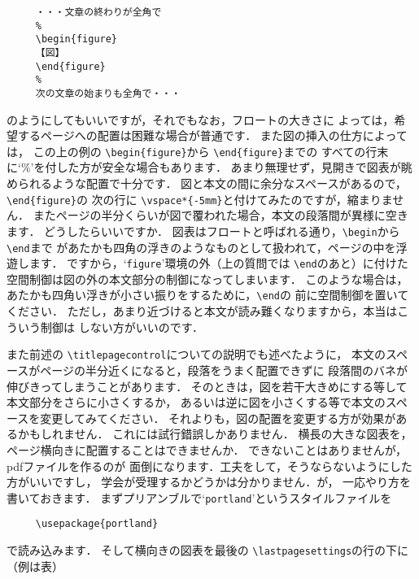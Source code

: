 \documentclass[dvipdfmx,onecolumn]{jsce}  %
\begin{document}
\begin{Enumerate}
\renewcommand{\baselinestretch}{.74}
\begin{verbatim}
     ・・・文章の終わりが全角で
     %
     \begin{figure}
     【図】
     \end{figure}
     %
     次の文章の始まりも全角で・・・
\end{verbatim}
\renewcommand{\baselinestretch}{1}
のようにしてもいいですが，それでもなお，フロートの大きさに
よっては，希望するページへの配置は困難な場合が普通です．
また図の挿入の仕方によっては，
この上の例の \verb+\begin{figure}+から \verb+\end{figure}+までの
すべての行末に`\%'を付した方が安全な場合もあります．
あまり無理せず，見開きで図表が眺められるような配置で十分です．
%
\Qitem 図と本文の間に余分なスペースがあるので，\verb+\end{figure}+の
次の行に \verb+\vspace*{-5mm}+と付けてみたのですが，縮まりません．
またページの半分くらいが図で覆われた場合，本文の段落間が異様に空きます．
どうしたらいいですか．
\Aitem 図表はフロートと呼ばれる通り，\verb+\begin+から \verb+\end+まで
があたかも四角の浮きのようなものとして扱われて，ページの中を浮遊します．
ですから，`{\tt figure}'環境の外（上の質問では \verb+\end+のあと）に付けた
空間制御は図の外の本文部分の制御になってしまいます．
このような場合は，あたかも四角い浮きが小さい振りをするために，\verb+\end+の
前に空間制御を置いてください．
ただし，あまり近づけると本文が読み難くなりますから，本当はこういう制御は
しない方がいいのです．

また前述の \verb+\titlepagecontrol+についての説明でも述べたように，
本文のスペースがページの半分近くになると，段落をうまく配置できずに
段落間のバネが伸びきってしまうことがあります．
そのときは，図を若干大きめにする等して本文部分をさらに小さくするか，
あるいは逆に図を小さくする等で本文のスペースを変更してみてください．
それよりも，図の配置を変更する方が効果があるかもしれません．
これには試行錯誤しかありません．
%
\Qitem 横長の大きな図表を，ページ横向きに配置することはできませんか．
\Aitem できないことはありませんが，pdfファイルを作るのが
面倒になります．工夫をして，そうならないようにした方がいいですし，
学会が受理するかどうかは分かりません．が，
一応やり方を書いておきます．
まずプリアンブルで`{\tt portland}'というスタイルファイルを
\begin{verbatim}
     \usepackage{portland}
\end{verbatim}
で読み込みます．
そして横向きの図表を最後の \verb+\lastpagesettings+の行の下に
（例は表）


\end{Enumerate}
\end{document}
